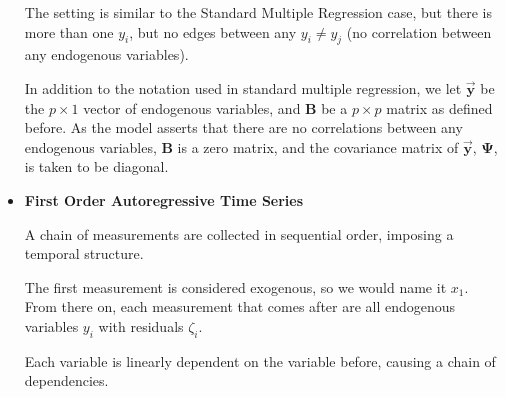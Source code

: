 \documentclass{article}
\begin{document}
\begin{multicols*}{2}
\begin{itemize}
    The setting is similar to the Standard Multiple Regression case, but there is more than one $y_i$, but no edges between any $y_i \neq y_j$ (no correlation between any endogenous variables).

    In addition to the notation used in standard multiple regression, we let $\mathbf{\vec{y}}$ be the $p \times 1$ vector of endogenous variables, and $\mathbf{B}$ be a $p \times p$ matrix as defined before. As the model asserts that there are no correlations between any endogenous variables, $\mathbf{B}$ is a zero matrix, and the covariance matrix of $\mathbf{\vec{y}}$, $\mathbf{\Psi}$, is taken to be diagonal.

    \item \textbf{First Order Autoregressive Time Series}
    
    A chain of measurements are collected in sequential order, imposing a temporal structure.

    The first measurement is considered exogenous, so we would name it $x_1$. From there on, each measurement that comes after are all endogenous variables $y_i$ with residuals $\zeta_i$. 
    
    Each variable is linearly dependent on the variable before, causing a chain of dependencies.
\end{itemize}

\end{multicols*}
\end{document}
